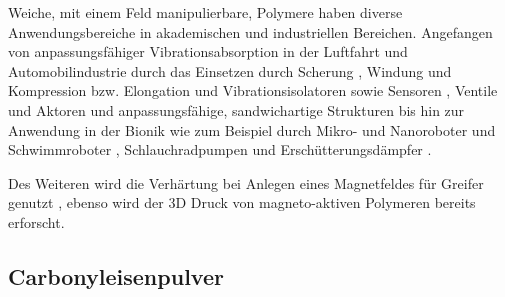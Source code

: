 Weiche, mit einem Feld manipulierbare, Polymere haben diverse Anwendungsbereiche in akademischen und industriellen Bereichen. Angefangen von anpassungsfähiger Vibrationsabsorption in der Luftfahrt und Automobilindustrie durch das Einsetzen durch Scherung \cite{Ginder_Schlotter_Nichols} \cite{Deng_Gong}, Windung \cite{Hoang_Zhang_Li_Du} und Kompression bzw. Elongation \cite{Kallio_2007} und Vibrationsisolatoren \cite{Ginder_2000} sowie Sensoren \cite{Ginder_2000} \cite{Martin_2006}, Ventile und Aktoren \cite{Boese_2012} \cite{Keip_2014} und anpassungsfähige, sandwichartige Strukturen \cite{Zhou_2005} \cite{Zhou_2006} \cite{Wei_2008} bis hin zur Anwendung in der Bionik wie zum Beispiel durch Mikro- und Nanoroboter und Schwimmroboter \cite{Qiu_2015} \cite{Xu_2015} \cite{Lum_2016} \cite{Hu_2018}, Schlauchradpumpen \cite{Fuhrer_2013} und Erschütterungsdämpfer \cite{Li_2013}.

Des Weiteren wird die Verhärtung bei Anlegen eines Magnetfeldes für Greifer genutzt \cite{Qi_2020}, ebenso wird der 3D Druck von magneto-aktiven Polymeren \cite{Sindersberger_2018} bereits erforscht.

%

\subsection{Carbonyleisenpulver} \label{cip}

